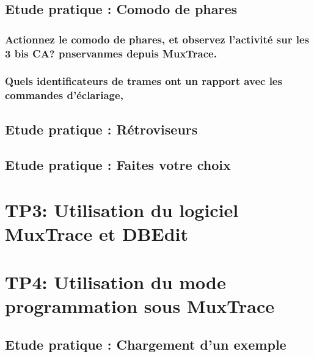 \documentclass{rapportECC}
\begin{document}
\subsection{Etude pratique : Comodo de phares}

\subsubsection*{Actionnez le comodo de phares, et observez l'activité sur les 3 bis CA? pnservanmes depuis MuxTrace.}
\subsubsection{Quels identificateurs de trames ont un rapport avec les commandes d'éclariage, }

\subsection{Etude pratique : Rétroviseurs}

\subsection{Etude pratique : Faites votre choix}

\section{TP3: Utilisation du logiciel MuxTrace et DBEdit}

\section{TP4: Utilisation du mode programmation sous MuxTrace}

\subsection{Etude pratique : Chargement d'un exemple}
\end{document}
